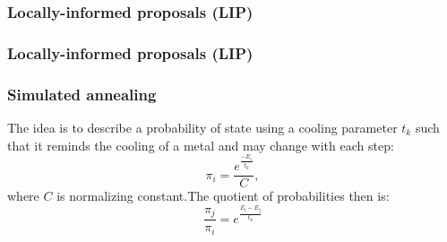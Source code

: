 \begin{frame}
	\frametitle{Locally-informed proposals (LIP)}
	
\end{frame}

\begin{frame}
	\frametitle{Locally-informed proposals (LIP)}
	
\end{frame}

\begin{frame}
	\frametitle{Simulated annealing}
	The idea is to describe a probability of state using a cooling parameter $t_k$ such that it reminds the cooling of a metal and may change with each step:
	\begin{equation*}
	\pi_i = \frac{e^{\frac{-E_i}{t_k}}}{C},
	\end{equation*}
	where $C$ is normalizing constant.The quotient of probabilities then is:
	\begin{equation*}
	\frac{\pi_j}{\pi_i} = e^{\frac{E_i - E_j}{t_k}}
	\end{equation*}
\end{frame}